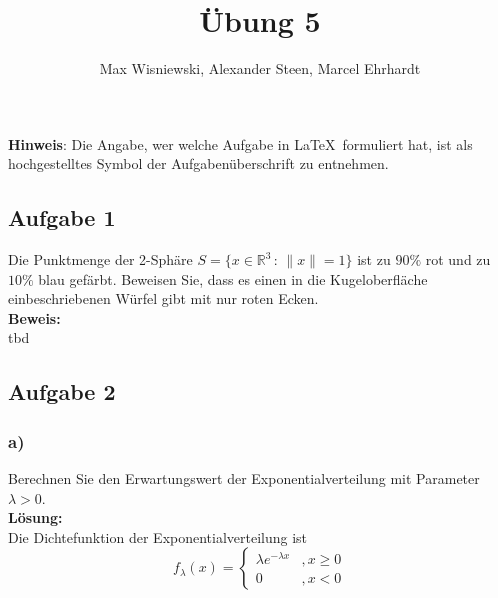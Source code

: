 \documentclass[11pt,a4paper,ngerman]{article}
\date{}
\title{Übung 5}
\author{Max Wisniewski\maxw, Alexander Steen\alex, Marcel Ehrhardt\marcel}
\begin{document}

\renewcommand{\figurename}{Figure}

\maketitle
\thispagestyle{fancy}

\begin{center}
\textbf{Hinweis}: Die Angabe, wer welche Aufgabe in \LaTeX\ formuliert hat, ist als hochgestelltes Symbol der Aufgabenüberschrift zu entnehmen.
\end{center}


\subsection*{Aufgabe 1}

Die Punktmenge der 2-Sphäre $S = \{ x \in \mathbb{R}^3 \, : \, \|x\| = 1\}$ ist zu $90\%$ rot und zu $10\%$ blau gefärbt. Beweisen Sie,
dass es einen in die Kugeloberfläche einbeschriebenen Würfel gibt mit nur roten Ecken.\\

\textbf{Beweis:}\\

tbd

\subsection*{Aufgabe 2}

\subsubsection*{a)}

Berechnen Sie den Erwartungswert der Exponentialverteilung mit Parameter $\lambda > 0$.\\

\textbf{Lösung:}\\

Die Dichtefunktion der Exponentialverteilung ist
\[
    f_\lambda (x) = \left\{ \begin{array}{rl} \lambda e^{-\lambda x} &, x\geq 0 \\ 0 &, x < 0 \end{array} \right.
\]
\end{document}
